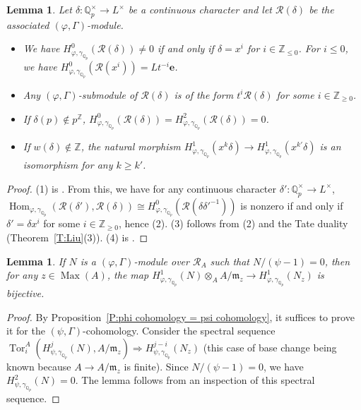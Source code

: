 \documentclass[12pt]{article}
\newtheorem{lemma}[theorem]{Lemma}
\theoremstyle{definition}
\numberwithin{equation}{theorem}
\newcommand{\calR}{\mathcal{R}}
\newcommand{\gothm}{\mathfrak{m}}
\newcommand{\QQ}{\mathbb{Q}}
\newcommand{\ZZ}{\mathbb{Z}}
\newcommand{\bbe}{\mathbf{e}}
\def\Qp{\QQ_p}
\DeclareMathOperator{\Hom}{Hom}
\DeclareMathOperator{\Max}{Max}
\DeclareMathOperator{\Tor}{Tor}
\begin{document}
\begin{lemma} \label{L:special rank 1}
Let $\delta: \Qp^\times \to L^\times$ be a continuous character and let $\calR(\delta)$ be the associated $(\varphi, \Gamma)$-module.
\begin{itemize}
\item[(1)] We have $H^0_{\varphi, \gamma_{\Qp}}(\calR(\delta)) \neq0$ if and only if $\delta = x^i$ for $i \in \ZZ_{\leq0}$.  For $i\leq 0$, we have $H^0_{\varphi, \gamma_{\Qp}}(\calR(x^i))= L t^{-i}\bbe$.
\item[(2)] Any $(\varphi, \Gamma)$-submodule of $\calR(\delta)$ is of the form $t^i\calR(\delta)$ for some $i \in \ZZ_{\geq 0}$.
\item[(3)] If $\delta(p) \notin p^\ZZ$, $H^0_{\varphi, \gamma_{\Qp}}(\calR(\delta)) = H^2_{\varphi, \gamma_{\Qp}}(\calR(\delta)) =0$.
\item[(4)] If $w(\delta) \notin \ZZ$, the natural morphism $H^1_{\varphi,\gamma_{\Qp}}(x^k\delta) \to H^1_{\varphi,\gamma_{\Qp}}(x^{k'}\delta)$ is an isomorphism for any $k \geq k'$.
\end{itemize}
\end{lemma}
\begin{proof}
(1) is \cite[Proposition~2.1]{colmez}. From this, we have for any
  continuous character $\delta': \Qp^\times \to L^\times$,
  $\Hom_{\varphi, \gamma_{\Qp}}(\calR(\delta'), \calR(\delta)) \cong
  H^0_{\varphi, \gamma_{\Qp}}(\calR(\delta\delta'^{-1}))$ is nonzero if and
  only if $\delta' = \delta x^i$ for some $i\in \ZZ_{\geq 0}$, hence
  (2).  (3) follows from (2) and the Tate duality
  (Theorem~\ref{T:Liu}(3)).  (4) is \cite[Theorem~2.22]{colmez}.
\end{proof}




\begin{lemma} \label{L:base change to point}
If $N$ is a $(\varphi, \Gamma)$-module over $\calR_A$ such that $N/(\psi-1)=0$, then for any $z \in \Max(A)$,
the map $H^1_{\varphi, \gamma_{\Qp}}(N) \otimes_A A /\gothm_z \to H^1_{\varphi,\gamma_{\Qp}}(N_z)$ is bijective.
\end{lemma}
\begin{proof}
By Proposition~\ref{P:phi cohomology = psi cohomology}, it suffices to prove it for the $(\psi, \Gamma)$-cohomology.  Consider the spectral sequence $\Tor_i^{A}(H^j_{\psi, \gamma_{\Qp}}(N), A/\gothm_z) \Rightarrow H^{j-i}_{\psi, \gamma_{\Qp}}(N_z)$ (this case of base change being known because $A \to A/\gothm_z$ is finite).  Since $N/(\psi-1) = 0$, we have $H^2_{\psi, \gamma_{\Qp}}(N)= 0$.  The lemma follows from an inspection of this spectral sequence.
\end{proof}
\end{document}
